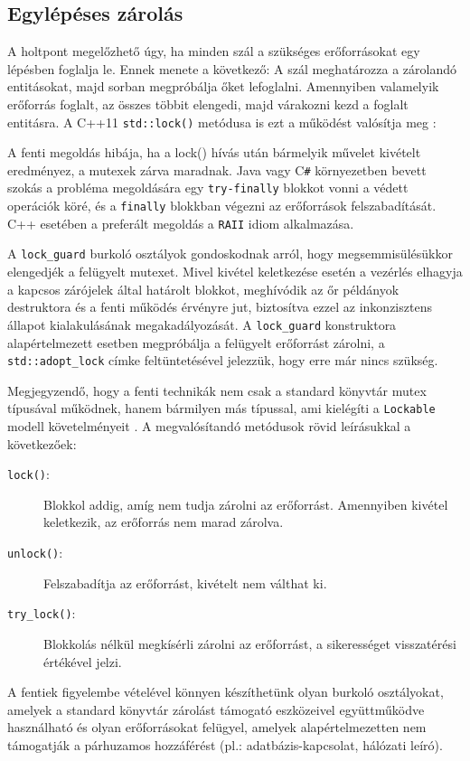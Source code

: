    \subsection{Egylépéses zárolás}
    \label{seq:onsestep}
    
    A holtpont megelőzhető úgy, ha minden szál a szükséges erőforrásokat egy lépésben foglalja le. Ennek menete a következő: A szál meghatározza a zárolandó entitásokat, majd sorban megpróbálja őket lefoglalni. Amennyiben valamelyik erőforrás foglalt, az összes többit elengedi, majd várakozni kezd a foglalt entitásra. A C++11 \texttt{std::lock()} metódusa is ezt a működést valósítja meg \cite{C++11/lock}:
    
%    
    A fenti megoldás hibája, ha a {lock()} hívás után bármelyik művelet kivételt eredményez, a mutexek zárva maradnak. Java vagy C\texttt{\#} környezetben bevett szokás a probléma megoldására egy \texttt{try-finally} blokkot vonni a védett operációk köré, és a \texttt{finally} blokkban végezni az erőforrások felszabadítását. C++ esetében a preferált megoldás a \texttt{RAII} idiom \cite{ExceptionalC++} alkalmazása.
    
%    
    A \texttt{lock\_guard} burkoló osztályok gondoskodnak arról, hogy megsemmisülésükkor elengedjék a felügyelt mutexet. Mivel kivétel keletkezése esetén a vezérlés elhagyja a kapcsos zárójelek által határolt blokkot, meghívódik az őr példányok destruktora és a fenti működés érvényre jut, biztosítva ezzel az inkonzisztens állapot kialakulásának megakadályozását. A \texttt{lock\_guard} konstruktora alapértelmezett esetben megpróbálja a felügyelt erőforrást zárolni, a \texttt{std::adopt\_lock} címke feltüntetésével jelezzük, hogy erre már nincs szükség.
    
    Megjegyzendő, hogy a fenti technikák nem csak a standard könyvtár mutex típusával működnek, hanem bármilyen más típussal, ami kielégíti a \texttt{Lockable} modell követelményeit \cite{C++11/Lockable}. A megvalósítandó metódusok rövid leírásukkal a következőek:
    
\begin{description}
    \item[\texttt{lock()}:] Blokkol addig, amíg nem tudja zárolni az erőforrást. Amennyiben kivétel keletkezik, az erőforrás nem marad zárolva.
    \item[\texttt{unlock()}:] Felszabadítja az erőforrást, kivételt nem válthat ki.
    \item[\texttt{try\_lock()}:] Blokkolás nélkül megkísérli zárolni az erőforrást, a sikerességet visszatérési értékével jelzi.
\end{description}
%
    A fentiek figyelembe vételével könnyen készíthetünk olyan burkoló osztályokat, amelyek a standard könyvtár zárolást támogató eszközeivel együttműködve használható és olyan erőforrásokat felügyel, amelyek alapértelmezetten nem támogatják a párhuzamos hozzáférést (pl.: adatbázis-kapcsolat, hálózati leíró).
    
